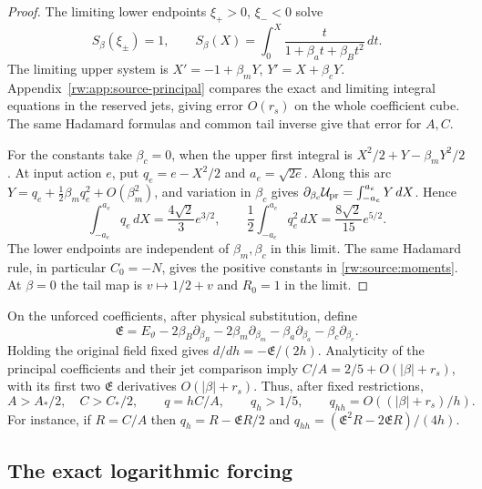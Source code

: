\begin{proof}
The limiting lower endpoints $\xi_+>0$, $\xi_-<0$ solve
\[
 S_\beta(\xi_\pm)=1,\qquad
 S_\beta(X)=\int_0^X\frac{t}{1+\beta_at+\beta_Bt^2}\,dt.
\]
The limiting upper system is $X'=-1+\beta_mY$,
$Y'=X+\beta_cY$. Appendix~\ref{rw:app:source-principal}
compares the exact and limiting integral equations in the reserved
jets, giving error $O(r_s)$ on the whole coefficient cube. The same
Hadamard formulas and common tail inverse give that error for $A,C$.

For the constants take $\beta_c=0$, when the upper first integral is
$X^2/2+Y-\beta_mY^2/2$. At input action $e$, put
$q_e=e-X^2/2$ and $a_e=\sqrt{2e}$. Along this arc
$Y=q_e+\tfrac12\beta_mq_e^2+O(\beta_m^2)$, and variation in
$\beta_c$ gives $\partial_{\beta_c}\mathcal U_{\rm pr}
=\int_{-a_e}^{a_e}Y\,dX$. Hence
\[
 \int_{-a_e}^{a_e}q_e\,dX=\frac{4\sqrt2}{3}e^{3/2},\qquad
 \frac12\int_{-a_e}^{a_e}q_e^2\,dX
                         =\frac{8\sqrt2}{15}e^{5/2}.
\]
The lower endpoints are independent of $\beta_m,\beta_c$ in this
limit. The same Hadamard rule, in particular $C_0=-N$, gives the
positive constants in \eqref{rw:source:moments}. At $\beta=0$ the
tail map is $v\mapsto1/2+v$ and $R_0=1$ in the limit.
\end{proof}

On the unforced coefficients, after physical substitution, define
\begin{equation}\label{rw:source:physical-E}
 \mathfrak E=E_\vartheta-2\beta_B\partial_{\beta_B}
 -2\beta_m\partial_{\beta_m}-\beta_a\partial_{\beta_a}
 -\beta_c\partial_{\beta_c}.
\end{equation}
Holding the original field fixed gives $d/dh=-\mathfrak E/(2h)$.
Analyticity of the principal coefficients and their jet comparison
imply $C/A=2/5+O(|\beta|+r_s)$, with its first two
$\mathfrak E$ derivatives $O(|\beta|+r_s)$. Thus, after fixed
restrictions,
\begin{equation}\label{rw:source:q-rates}
 A>A_*/2,\quad C>C_*/2,\qquad
 q=hC/A,\qquad q_h>1/5,\qquad
 q_{hh}=O((|\beta|+r_s)/h).
\end{equation}
For instance, if $R=C/A$ then
$q_h=R-\mathfrak ER/2$ and
$q_{hh}=(\mathfrak E^2R-2\mathfrak ER)/(4h)$.

\subsection{The exact logarithmic forcing}

